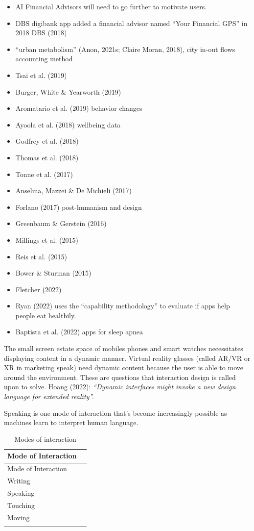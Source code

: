 \documentclass[
  letterpaper,
  DIV=11,
  numbers=noendperiod]{scrartcl}
\begin{document}
\begin{itemize}
\item
  AI Financial Advisors will need to go further to motivate users.
\item
  DBS digibank app added a financial advisor named ``Your Financial
  GPS'' in 2018 DBS (2018)
\item
  ``urban metabolism'' (Anon, 2021s; Claire Moran, 2018), city in-out
  flows accounting method
\item
  Tsai et al. (2019)
\item
  Burger, White \& Yearworth (2019)
\item
  Aromatario et al. (2019) behavior changes
\item
  Ayoola et al. (2018) wellbeing data
\item
  Godfrey et al. (2018)
\item
  Thomas et al. (2018)
\item
  Tonne et al. (2017)
\item
  Anselma, Mazzei \& De Michieli (2017)
\item
  Forlano (2017) post-humanism and design
\item
  Greenbaum \& Gerstein (2016)
\item
  Millings et al. (2015)
\item
  Reis et al. (2015)
\item
  Bower \& Sturman (2015)
\item
  Fletcher (2022)
\item
  Ryan (2022) uses the ``capability methodology'' to evaluate if apps
  help people eat healthily.
\item
  Baptista et al. (2022) apps for sleep apnea
\end{itemize}

The small screen estate space of mobiles phones and smart watches
necessitates displaying content in a dynamic manner. Virtual reality
glasses (called AR/VR or XR in marketing speak) need dynamic content
because the user is able to move around the environment. These are
questions that interaction design is called upon to solve. Hoang (2022):
\emph{``Dynamic interfaces might invoke a new design language for
extended reality''.}

Speaking is one mode of interaction that's become increasingly possible
as machines learn to interpret human language.

\begin{longtable}[]{@{}ll@{}}
\caption{Modes of interaction}\tabularnewline
\toprule\noalign{}
Mode of Interaction & \\
\midrule\noalign{}
\endfirsthead
\toprule\noalign{}
Mode of Interaction & \\
\midrule\noalign{}
\endhead
\bottomrule\noalign{}
\endlastfoot
Writing & \\
Speaking & \\
Touching & \\
Moving & \\
& \\
\end{longtable}
\end{document}
